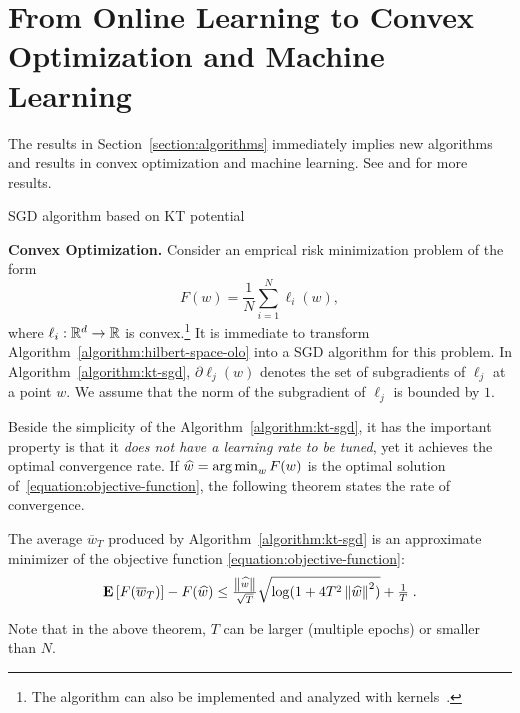 \section{From Online Learning to Convex Optimization and Machine Learning}
\label{section:applications}

The results in Section~\ref{section:algorithms} immediately implies new
algorithms and results in convex optimization and machine learning. See
\cite{Orabona-2014} and \cite{Luo-Schapire-2015} for more results.

\begin{algorithm}[t]
\caption{SGD algorithm based on KT potential \label{algorithm:kt-sgd}}
\begin{algorithmic}[1]
{
\ENDFOR
{}
}
\end{algorithmic}
\end{algorithm}

\textbf{Convex Optimization.} 
Consider an emprical risk minimization problem of the form
%
\begin{equation}
\label{equation:objective-function}
F(w) = \frac{1}{N} \sum_{i=1}^N \ell_i(w),
\end{equation}
%
where $\ell_i:\mathbb{R}^d \to \mathbb{R}$ is convex.\footnote{The algorithm can also be
implemented and analyzed with kernels~\citep{Orabona-2014}.} It is immediate to
transform Algorithm~\ref{algorithm:hilbert-space-olo} into a \ac{SGD} algorithm
for this problem. In Algorithm~\ref{algorithm:kt-sgd}, $\partial\ell_j(w)$
denotes the set of subgradients of $\ell_j$ at a point $w$.  We assume that the
norm of the subgradient of $\ell_j$ is bounded by $1$.

Beside the simplicity of the Algorithm~\ref{algorithm:kt-sgd}, it has the
important property is that it \emph{does not have a learning rate to be tuned},
yet it achieves the optimal convergence rate. If $\widehat{w} = \operatorname*{arg\,min}_w F(w)$
is the optimal solution of~\eqref{equation:objective-function}, the following
theorem states the rate of convergence.
%
\begin{theorem}
The average $\overline{w}_T$ produced by Algorithm~\ref{algorithm:kt-sgd} is
an approximate minimizer of the objective function \eqref{equation:objective-function}:
\[
\operatorname*{\mathbf{E}}\left[F(\overline{w}_T)\right] - F(\widehat{w}) \leq \tfrac{\left\|{\widehat{w}}\right\|}{\sqrt{T}} \sqrt{\log(1+4 T^2 \left\|{\widehat{w}}\right\|^2)} +\tfrac{1}{T} \; .
\]
\end{theorem}
%
Note that in the above theorem, $T$ can be larger (multiple epochs) or smaller
than $N$.

